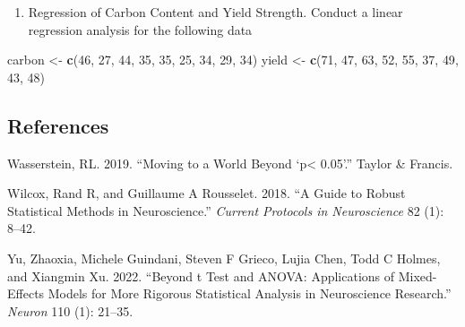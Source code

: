 \documentclass[
]{article}
\newenvironment{Shaded}{\begin{snugshade}}{\end{snugshade}}
\newcommand{\DecValTok}[1]{\textcolor[rgb]{0.00,0.00,0.81}{#1}}
\newcommand{\FunctionTok}[1]{\textcolor[rgb]{0.13,0.29,0.53}{\textbf{#1}}}
\newcommand{\NormalTok}[1]{#1}
\newcommand{\OtherTok}[1]{\textcolor[rgb]{0.56,0.35,0.01}{#1}}
\providecommand{\tightlist}{%
  \setlength{\itemsep}{0pt}\setlength{\parskip}{0pt}}
\newlength{\cslhangindent}
\newlength{\cslentryspacingunit} %
\newenvironment{CSLReferences}[2] %
 {%
  \setlength{\parindent}{0pt}
  \ifodd #1
  \let\oldpar\par
  \def\par{\hangindent=\cslhangindent\oldpar}
  \fi
  \setlength{\parskip}{#2\cslentryspacingunit}
 }%
 {}
\begin{document}
\begin{enumerate}
\def\labelenumi{\arabic{enumi}.}
\setcounter{enumi}{1}
\tightlist
\item
  Regression of Carbon Content and Yield Strength. Conduct a linear
  regression analysis for the following data
\end{enumerate}

\begin{Shaded}
\begin{Highlighting}[]
\NormalTok{carbon }\OtherTok{\textless{}{-}} \FunctionTok{c}\NormalTok{(}\DecValTok{46}\NormalTok{, }\DecValTok{27}\NormalTok{, }\DecValTok{44}\NormalTok{, }\DecValTok{35}\NormalTok{, }\DecValTok{35}\NormalTok{, }\DecValTok{25}\NormalTok{, }\DecValTok{34}\NormalTok{, }\DecValTok{29}\NormalTok{, }\DecValTok{34}\NormalTok{)}
\NormalTok{yield }\OtherTok{\textless{}{-}} \FunctionTok{c}\NormalTok{(}\DecValTok{71}\NormalTok{, }\DecValTok{47}\NormalTok{, }\DecValTok{63}\NormalTok{, }\DecValTok{52}\NormalTok{, }\DecValTok{55}\NormalTok{, }\DecValTok{37}\NormalTok{, }\DecValTok{49}\NormalTok{, }\DecValTok{43}\NormalTok{, }\DecValTok{48}\NormalTok{)}
\end{Highlighting}
\end{Shaded}

\hypertarget{references}{%
\subsection*{References}\label{references}}

\hypertarget{refs}{}
\begin{CSLReferences}{1}{0}
\leavevmode{}%
Wasserstein, RL. 2019. {``Moving to a World Beyond {`p\textless{}
0.05'}.''} Taylor \& Francis.

\leavevmode{}%
Wilcox, Rand R, and Guillaume A Rousselet. 2018. {``A Guide to Robust
Statistical Methods in Neuroscience.''} \emph{Current Protocols in
Neuroscience} 82 (1): 8--42.

\leavevmode{}%
Yu, Zhaoxia, Michele Guindani, Steven F Grieco, Lujia Chen, Todd C
Holmes, and Xiangmin Xu. 2022. {``Beyond t Test and ANOVA: Applications
of Mixed-Effects Models for More Rigorous Statistical Analysis in
Neuroscience Research.''} \emph{Neuron} 110 (1): 21--35.

\end{CSLReferences}
\end{document}
